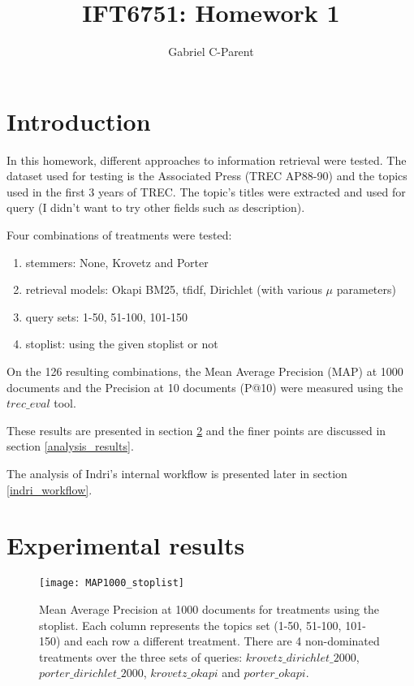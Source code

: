 \documentclass{article} %
\author{
Gabriel C-Parent\\
}
\begin{document}
\title{IFT6751: Homework 1}
      
\maketitle
\section{Introduction}

In this homework, different approaches to information retrieval were tested. The dataset used for testing is the Associated Press (TREC AP88-90) and the topics used in the first 3 years of TREC. The topic's titles were extracted and used for query (I didn't want to try other fields such as description). \newline


Four combinations of treatments were tested:
\begin{enumerate}
	\item stemmers: None, Krovetz and Porter
	\item retrieval models: Okapi BM25, tfidf, Dirichlet (with various $\mu$ parameters)
	\item query sets: 1-50, 51-100, 101-150
	\item stoplist: using the given stoplist or not
\end{enumerate}


On the 126 resulting combinations, the Mean Average Precision (MAP) at 1000 documents and the Precision at 10 documents (P@10) were measured using the $trec\_eval$ tool.

These results are presented in section \ref{exp_results} and the finer points are discussed in section \ref{analysis_results}.


The analysis of Indri's internal workflow is presented later in section \ref{indri_workflow}.



\newpage

\section{Experimental results}
\label{exp_results}


\begin{figure}[!htb]
\begin{center}
 \texttt{[image: MAP1000\_stoplist]}
 \caption{\small  Mean Average Precision at 1000 documents for treatments using the stoplist. Each column represents the topics set (1-50, 51-100, 101-150) and each row a different treatment. There are 4 non-dominated treatments over the three sets of queries: $krovetz\_dirichlet\_2000$, $porter\_dirichlet\_2000$, $krovetz\_okapi$ and $porter\_okapi$.}
 \label{mapstoplist}
 \end{center}
\end{figure}
\end{document}

